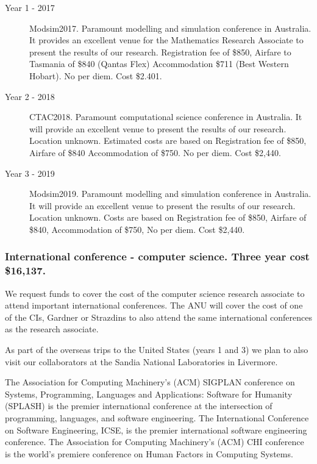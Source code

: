 \documentclass[a4paper,fontsize=12pt]{scrartcl}
\begin{document}
\begin{description}
\item[Year 1 - 2017] Modsim2017.
Paramount modelling and simulation conference in Australia. It provides an excellent venue for the Mathematics Research Associate to present the results of our research. 
Registration fee of \$850, 
Airfare to Tasmania of \$840 (Qantas Flex)
Accommodation \$711 (Best Western Hobart).  
No per diem. Cost \$2.401.



\item[Year 2 - 2018] CTAC2018.
Paramount computational science conference in Australia. It will provide an excellent venue to present the results of our research. Location unknown.
Estimated costs are based on 
Registration fee of \$850, 
Airfare of \$840
Accommodation of \$750.
No per diem. Cost \$2,440.

\item[Year 3 - 2019] Modsim2019.
Paramount modelling and simulation conference in Australia. It will provide an excellent venue to present the results of our research. Location unknown.
Costs are based on 
Registration fee of \$850, 
Airfare of \$840,
Accommodation of \$750,
No per diem. Cost \$2,440.




\end{description}

\subsubsection*{International conference - computer science. Three year cost \$16,137.}

We request funds to cover the cost of the computer science research associate to attend important international conferences.    
The ANU will cover the cost of one of the CIs, Gardner or Strazdins to also attend the same international conferences as the research associate. 

As part of the overseas trips to the United States (years 1 and 3) we plan to also visit our collaborators at the Sandia National Laboratories in Livermore. 

The  Association for Computing Machinery’s (ACM) SIGPLAN conference on Systems, Programming, Languages and Applications: Software for Humanity (SPLASH) is the premier international conference at the intersection of programming, languages, and software engineering.
The International Conference on Software Engineering, ICSE, is the premier international software engineering conference.
The Association for Computing Machinery’s (ACM) CHI conference is the world's premiere conference on Human Factors in Computing Systems.
\end{document}
